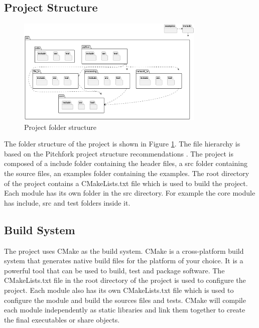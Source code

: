 \begin{spacing}{1.2}
    \subsection{Project Structure}
    \begin{figure}[hb]
        \centering
        \includegraphics[width=0.8\textwidth]{Chapitre2/figures/folders.png}
        \caption{Project folder structure}
        \label{fig:folders}
    \end{figure}
    The folder structure of the project is shown in Figure \ref{fig:folders}. The file hierarchy
    is based on the Pitchfork project structure recommendations \cite{pitchfork}.
    The project is composed of a include folder containing the header files,
    a src folder containing the source files,
    an examples folder containing the examples.
    The root directory of the project contains a CMakeLists.txt file which is used to build the project.
    Each module has its own folder in the src directory.
    For example the core module has include, src and test folders inside it.




    \subsection{Build System}
    The project uses CMake as the build system. CMake is a cross-platform build system that
    generates native build files for the platform of your choice. It is a powerful tool that
    can be used to build, test and package software. The CMakeLists.txt file in the root directory
    of the project is used to configure the project. Each module also has its own CMakeLists.txt
    file which is used to configure the module and build the sources files and tests. CMake will compile
    each module independently as static libraries and link them together to create the final
    executables or share objects.\\


\end{spacing}

